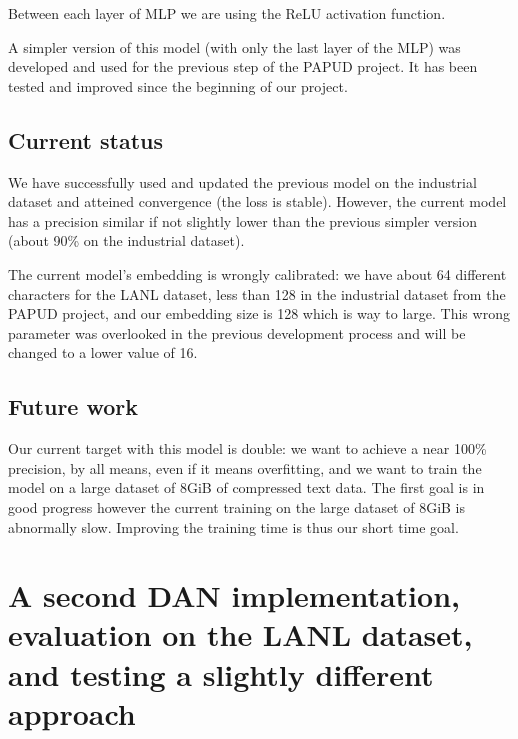 Between each layer of MLP we are using the ReLU activation function.

A simpler version of this model (with only the last layer of the MLP) was developed and used for the previous step of the PAPUD project. It has been tested and improved since the beginning of our project.

\subsection{Current status}
We have successfully used and updated the previous model on the industrial dataset and atteined convergence (the loss is stable). However, the current model has a precision similar if not slightly lower than the previous simpler version (about 90\%  on the industrial dataset).

The current model's embedding is wrongly calibrated: we have about 64 different characters for the LANL dataset, less than 128 in the industrial dataset from the PAPUD project, and our embedding size is 128 which is way to large. This wrong parameter was overlooked in the previous development process and will be changed to a lower value of 16.

\subsection{Future work}
Our current target with this model is double:
we want to achieve a near 100\% precision, by all means, even if it means overfitting, and we want to train the model on a large dataset of 8GiB of compressed text data. The first goal is in good progress however the current training on the large dataset of 8GiB is abnormally slow. Improving the training time is thus our short time goal.

\section{A second DAN implementation, evaluation on the LANL dataset, and testing a slightly different approach}

